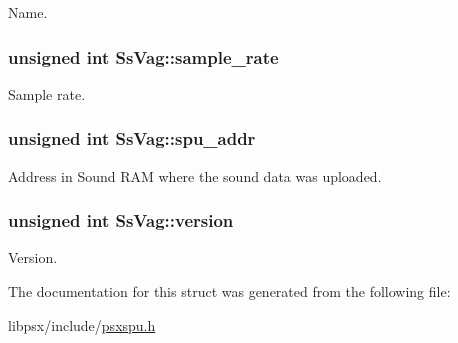 Name. 

\hypertarget{structSsVag_adf52d04265b92a1aa68b63ed235cfdfa}{}
\subsubsection[{sample\+\_\+rate}]{\setlength{\rightskip}{0pt plus 5cm}unsigned int Ss\+Vag\+::sample\+\_\+rate}\label{structSsVag_adf52d04265b92a1aa68b63ed235cfdfa}


Sample rate. 

\hypertarget{structSsVag_a69eb2b0fb6383829e4e148dd1be8bdde}{}
\subsubsection[{spu\+\_\+addr}]{\setlength{\rightskip}{0pt plus 5cm}unsigned int Ss\+Vag\+::spu\+\_\+addr}\label{structSsVag_a69eb2b0fb6383829e4e148dd1be8bdde}


Address in Sound R\+A\+M where the sound data was uploaded. 

\hypertarget{structSsVag_ad9ab18aa60cbf2641b770dfc0a51d2dc}{}
\subsubsection[{version}]{\setlength{\rightskip}{0pt plus 5cm}unsigned int Ss\+Vag\+::version}\label{structSsVag_ad9ab18aa60cbf2641b770dfc0a51d2dc}


Version. 



The documentation for this struct was generated from the following file\+:\begin{DoxyCompactItemize}
\item 
libpsx/include/\hyperlink{psxspu_8h}{psxspu.\+h}\end{DoxyCompactItemize}
